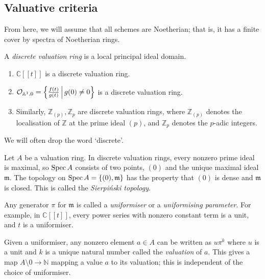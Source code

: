 \subsection{Valuative criteria}
From here, we will assume that all schemes are Noetherian; that is, it has a finite cover by spectra of Noetherian rings.
\begin{definition}
    A \emph{discrete valuation ring} is a local principal ideal domain.
\end{definition}
\begin{example}
    \begin{enumerate}
        \item \( \mathbb C[\![t]\!] \) is a discrete valuation ring.
        \item \( \mathcal O_{\mathbb A^1, 0} = \qty{\frac{f(t)}{g(t)} \,\middle|\,g(0) \neq 0} \) is a discrete valuation ring.
        \item Similarly, \( \mathbb Z_{(p)}, \mathbb Z_p \) are discrete valuation rings, where \( \mathbb Z_{(p)} \) denotes the localisation of \( \mathbb Z \) at the prime ideal \( (p) \), and \( \mathbb Z_p \) denotes the \( p \)-adic integers.
    \end{enumerate}
\end{example}
We will often drop the word `discrete'.
\begin{remark}
    Let \( A \) be a valuation ring.
    In discrete valuation rings, every nonzero prime ideal is maximal, so \( \operatorname{Spec} A \) consists of two points, \( (0) \) and the unique maximal ideal \( \mathfrak m \).
    The topology on \( \operatorname{Spec} A = \qty{(0), \mathfrak m} \) has the property that \( (0) \) is dense and \( \mathfrak m \) is closed.
    This is called the \emph{Sierpi\'nski topology}.

    Any generator \( \pi \) for \( \mathfrak m \) is called a \emph{uniformiser} or a \emph{uniformising parameter}.
    For example, in \( \mathbb C[\![t]\!] \), every power series with nonzero constant term is a unit, and \( t \) is a uniformiser.

    Given a uniformiser, any nonzero element \( a \in A \) can be written as \( u \pi^k \) where \( u \) is a unit and \( k \) is a unique natural number called the \emph{valuation} of \( a \).
    This gives a map \( A \setminus \qty{0} \to \mathbb N \) mapping a value \( a \) to its valuation; this is independent of the choice of uniformiser.
\end{remark}
